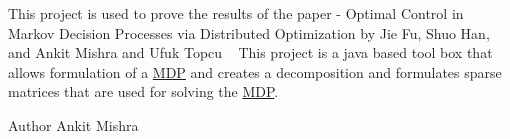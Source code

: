 This project is used to prove the results of the paper -\/ Optimal Control in Markov Decision Processes via Distributed Optimization by Jie Fu, Shuo Han, and Ankit Mishra and Ufuk Topcu ~\newline
This project is a java based tool box that allows formulation of a \hyperlink{classese_1_1seas_1_1upenn_1_1edu_1_1_m_d_p}{M\+D\+P} and creates a decomposition and formulates sparse matrices that are used for solving the \hyperlink{classese_1_1seas_1_1upenn_1_1edu_1_1_m_d_p}{M\+D\+P}.\begin{DoxyAuthor}{Author}
Ankit Mishra 
\end{DoxyAuthor}
